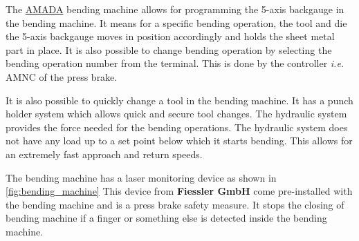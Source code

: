 The \hyperref[acro:AMADA]{AMADA} bending machine allows for programming the 5-axis backgauge in the bending machine. It means
for a specific bending operation, the tool and die the 5-axis backgauge
moves in position accordingly and holds the sheet metal part in place. It is also possible to change bending operation by selecting the bending operation number
from the terminal. This is done by the controller \textit{i.e.} AMNC of the press brake.

It is also possible to quickly change a tool in the bending machine. It has a punch holder system  which allows quick and secure tool changes.
The hydraulic system provides the force needed for the bending operations. The hydraulic system does not have any load up to a set point below which
it starts bending. This allows for an extremely fast approach and return speeds. \cite{amada-machine}

The bending machine has a laser monitoring device as shown in \ref{fig:bending_machine}
This device from \textbf{Fiessler GmbH} come pre-installed with the bending machine and is a press brake safety measure. It stops the closing of bending machine if a finger or something else is detected
inside the bending machine.

